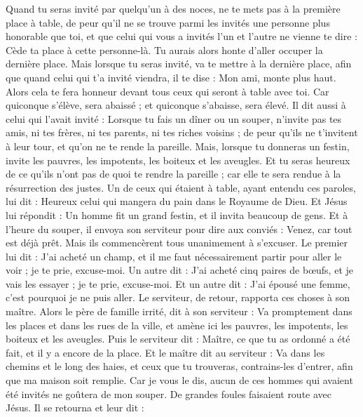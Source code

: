 \begin{multicols}{2}
Quand tu seras invité par quelqu'un à des noces, ne te mets pas à la première place à table, de peur qu'il ne se trouve parmi les invités une personne plus honorable que toi,
et que celui qui vous a invités l’un et l’autre ne vienne te dire : Cède ta place à cette personne-là. Tu aurais alors honte d’aller occuper la dernière place.
Mais lorsque tu seras invité, va te mettre à la dernière place, afin que quand celui qui t'a invité viendra, il te dise : Mon ami, monte plus haut. Alors cela te fera honneur devant tous ceux qui seront à table avec toi.
Car quiconque s'élève, sera abaissé ; et quiconque s'abaisse, sera élevé.
Il dit aussi à celui qui l'avait invité : Lorsque tu fais un dîner ou un souper, n'invite pas tes amis, ni tes frères, ni tes parents, ni tes riches voisins ; de peur qu'ils ne t’invitent à leur tour, et qu’on ne te rende la pareille.
Mais, lorsque tu donneras un festin, invite les pauvres, les impotents, les boiteux et les aveugles.
Et tu seras heureux de ce qu'ils n'ont pas de quoi te rendre la pareille ; car elle te sera rendue à la résurrection des justes.
Un de ceux qui étaient à table, ayant entendu ces paroles, lui dit : Heureux celui qui mangera du pain dans le Royaume de Dieu.
Et Jésus lui répondit : Un homme fit un grand festin, et il invita beaucoup de gens.
Et à l'heure du souper, il envoya son serviteur pour dire aux conviés : Venez, car tout est déjà prêt.
Mais ils commencèrent tous unanimement à s'excuser. Le premier lui dit : J’ai acheté un champ, et il me faut nécessairement partir pour aller le voir ; je te prie, excuse-moi.
Un autre dit : J’ai acheté cinq paires de bœufs, et je vais les essayer ; je te prie, excuse-moi.
Et un autre dit : J’ai épousé une femme, c'est pourquoi je ne puis aller.
Le serviteur, de retour, rapporta ces choses à son maître. Alors le père de famille irrité, dit à son serviteur : Va promptement dans les places et dans les rues de la ville, et amène ici les pauvres, les impotents, les boiteux et les aveugles.
Puis le serviteur dit : Maître, ce que tu as ordonné a été fait, et il y a encore de la place.
Et le maître dit au serviteur : Va dans les chemins et le long des haies, et ceux que tu trouveras, contrains-les d'entrer, afin que ma maison soit remplie.
Car je vous le dis, aucun de ces hommes qui avaient été invités ne goûtera de mon souper.
De grandes foules faisaient route avec Jésus. Il se retourna et leur dit :

\end{multicols}
